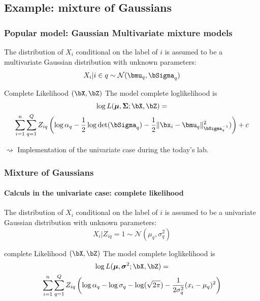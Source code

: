 \documentclass{beamer}\usepackage[]{graphicx}\usepackage[]{color}
\begin{document}

\subsection{Example: mixture of Gaussians}

\begin{frame}
  \frametitle{Popular model: Gaussian Multivariate mixture models}

  The distribution of $X_i$ conditional on the label of $i$ is assumed to be a multivariate Gaussian distribution with unknown parameters:
  \begin{equation*}
  X_i | i \in q \sim \mathcal{N}(\bmu_q,\bSigma_q)
  \end{equation*}

  \begin{block}{Complete Likelihood $(\bX,\bZ)$}
  The model complete loglikelihood is
    \begin{multline*}
        \log L(\boldsymbol{\mu},\boldsymbol{\Sigma}; \bX, \bZ)  = \\ \sum_{i=1}^n \sum_{q=1}^Q Z_{iq} \left(\log \alpha_q - \frac{1}{2}\log\mathrm{det}(\bSigma_q) - \frac{1}{2} \|\bx_i - \bmu_q\|^2_{\bSigma_q^{-1}}) \right) + c
   \end{multline*}
  \end{block}
  

  $\rightsquigarrow$ Implementation of the univariate case during the today's lab.
\end{frame}

\begin{frame}
  \frametitle{Mixture of Gaussians}
  \framesubtitle{Calculs in the univariate case: complete likelihood}

  The distribution of $X_i$ conditional on the label of $i$ is assumed to be a univariate Gaussian distribution with unknown parameters:
  \begin{equation*}
  X_i | Z_{iq} = 1 \sim \mathcal{N}(\mu_q,\sigma^2_q)
  \end{equation*}

  \begin{block}{complete Likelihood $(\bX,\bZ)$}
  The model complete loglikelihood is
    \begin{multline*}
        \log L(\boldsymbol{\mu},\boldsymbol{\sigma}^2; \bX, \bZ)  = \\ \sum_{i=1}^n \sum_{q=1}^Q Z_{iq} \left(\log \alpha_q - \log\sigma_q -\log(\sqrt{2\pi}) - \frac{1}{2\sigma_q^2} (x_i - \mu_q)^2 \right)
   \end{multline*}
  \end{block}

\end{frame}
 
\end{document}
